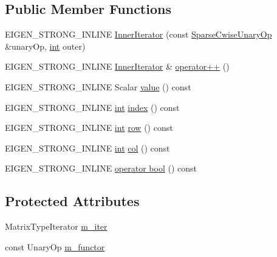 \subsection*{Public Member Functions}
\begin{DoxyCompactItemize}
\item 
E\-I\-G\-E\-N\-\_\-\-S\-T\-R\-O\-N\-G\-\_\-\-I\-N\-L\-I\-N\-E \hyperlink{class_sparse_cwise_unary_op_1_1_inner_iterator_abf783ea55cc59a024ba1e866969c614e}{Inner\-Iterator} (const \hyperlink{class_sparse_cwise_unary_op}{Sparse\-Cwise\-Unary\-Op} \&unary\-Op, \hyperlink{ioapi_8h_a787fa3cf048117ba7123753c1e74fcd6}{int} outer)
\item 
E\-I\-G\-E\-N\-\_\-\-S\-T\-R\-O\-N\-G\-\_\-\-I\-N\-L\-I\-N\-E \hyperlink{class_sparse_cwise_unary_op_1_1_inner_iterator}{Inner\-Iterator} \& \hyperlink{class_sparse_cwise_unary_op_1_1_inner_iterator_aa321e62ce9548b3d54a854b4d68b72f0}{operator++} ()
\item 
E\-I\-G\-E\-N\-\_\-\-S\-T\-R\-O\-N\-G\-\_\-\-I\-N\-L\-I\-N\-E Scalar \hyperlink{class_sparse_cwise_unary_op_1_1_inner_iterator_a8678b7f952b8b279da1f3b585804e867}{value} () const 
\item 
E\-I\-G\-E\-N\-\_\-\-S\-T\-R\-O\-N\-G\-\_\-\-I\-N\-L\-I\-N\-E \hyperlink{ioapi_8h_a787fa3cf048117ba7123753c1e74fcd6}{int} \hyperlink{class_sparse_cwise_unary_op_1_1_inner_iterator_a45f6bb4aac3ccd10354fe19b3226ab69}{index} () const 
\item 
E\-I\-G\-E\-N\-\_\-\-S\-T\-R\-O\-N\-G\-\_\-\-I\-N\-L\-I\-N\-E \hyperlink{ioapi_8h_a787fa3cf048117ba7123753c1e74fcd6}{int} \hyperlink{class_sparse_cwise_unary_op_1_1_inner_iterator_a761334e7cdb4b2557f001ea68dd13c57}{row} () const 
\item 
E\-I\-G\-E\-N\-\_\-\-S\-T\-R\-O\-N\-G\-\_\-\-I\-N\-L\-I\-N\-E \hyperlink{ioapi_8h_a787fa3cf048117ba7123753c1e74fcd6}{int} \hyperlink{class_sparse_cwise_unary_op_1_1_inner_iterator_aab6391456ade105f913b62b15aa4eb26}{col} () const 
\item 
E\-I\-G\-E\-N\-\_\-\-S\-T\-R\-O\-N\-G\-\_\-\-I\-N\-L\-I\-N\-E \hyperlink{class_sparse_cwise_unary_op_1_1_inner_iterator_a940ffd6dac9bf959db5a267aa6878f41}{operator bool} () const 
\end{DoxyCompactItemize}
\subsection*{Protected Attributes}
\begin{DoxyCompactItemize}
\item 
Matrix\-Type\-Iterator \hyperlink{class_sparse_cwise_unary_op_1_1_inner_iterator_a0b7ca4bcd6452664c580d1245bf8aa4e}{m\-\_\-iter}
\item 
const Unary\-Op \hyperlink{class_sparse_cwise_unary_op_1_1_inner_iterator_a2a24282b74c70983989a7afe4b408a2f}{m\-\_\-functor}
\end{DoxyCompactItemize}


